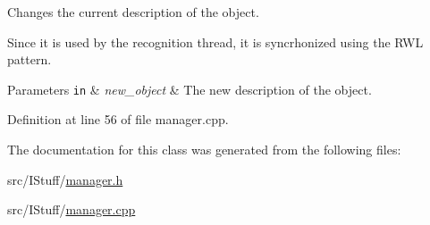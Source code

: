 Changes the current description of the object. 

Since it is used by the recognition thread, it is syncrhonized using the R\-W\-L pattern.


\begin{DoxyParams}[1]{Parameters}
\mbox{\tt in}  & {\em new\-\_\-object} & The new description of the object. \\
\hline
\end{DoxyParams}


Definition at line 56 of file manager.\-cpp.



The documentation for this class was generated from the following files\-:\begin{DoxyCompactItemize}
\item 
src/\-I\-Stuff/\hyperlink{manager_8h}{manager.\-h}\item 
src/\-I\-Stuff/\hyperlink{manager_8cpp}{manager.\-cpp}\end{DoxyCompactItemize}
